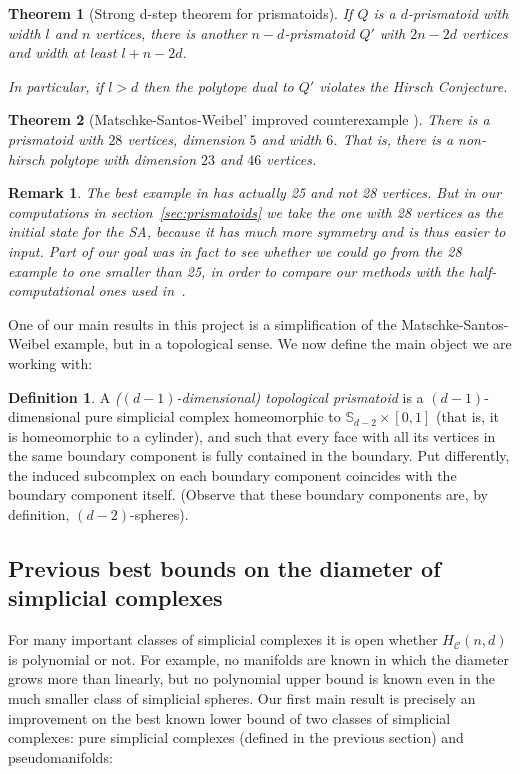 \documentclass[12pt,a4paper]{article}
\theoremstyle{plain}
\newtheorem{theorem}{Theorem}
\newtheorem*{remark}{Remark}
\theoremstyle{definition}
\newtheorem{definition}{Definition}
\begin{document}
\begin{theorem}[Strong d-step theorem for prismatoids\cite{counterexample}]
  If $Q$ is a $d$-prismatoid with width $l$ and $n$ vertices, there is another $n-d$-prismatoid $Q'$ with $2n-2d$ vertices and width at least $l+n-2d$.

  In particular, if $l>d$ then the polytope dual to $Q'$ violates the Hirsch Conjecture.
\end{theorem}

\begin{theorem}[Matschke-Santos-Weibel' improved counterexample \cite{improvement}]
There is a prismatoid with $28$ vertices, dimension $5$ and width $6$. That is, there is a non-hirsch polytope with dimension $23$ and $46$ vertices.
\end{theorem}

\begin{remark}
The best example in \cite{improvement} has actually 25 and not 28 vertices. But in our computations in section~\ref{sec:prismatoids} we take the one with 28 vertices as the initial state for the SA, because it has much more symmetry and is thus easier to input. Part of our goal was in fact to see whether we could go from the 28 example to one smaller than 25, in order to compare our methods with the half-computational ones used in~\cite{improvement}.
\end{remark}

One of our main results in this project is a simplification of the Matschke-Santos-Weibel example, but in a topological sense. We now define the main object we are working with:

\begin{definition}
  A \emph{($(d-1)$-dimensional) topological prismatoid} is a $(d-1)$-dimensional pure simplicial complex homeomorphic to $\mathbb{S}_{d-2}\times [0,1]$ (that is, it is homeomorphic to a cylinder), and such that every face with all its vertices in the same boundary component is fully contained in the boundary. Put differently, the induced subcomplex on each boundary component coincides with the boundary component itself.
(Observe that these boundary components are, by definition, $(d-2)$-spheres).
\end{definition}

\subsection{Previous best bounds on the diameter of simplicial complexes}
For many important classes of simplicial complexes it is open whether $H_\mathcal{C}(n,d)$ is polynomial or not. For example, no manifolds are known in which the diameter grows more than linearly, but no polynomial upper bound is known even in the much smaller class of simplicial spheres.
Our first main result is precisely an improvement on the best known lower bound of two classes of simplicial complexes: pure simplicial complexes (defined in the previous section) and pseudomanifolds:
\end{document}
